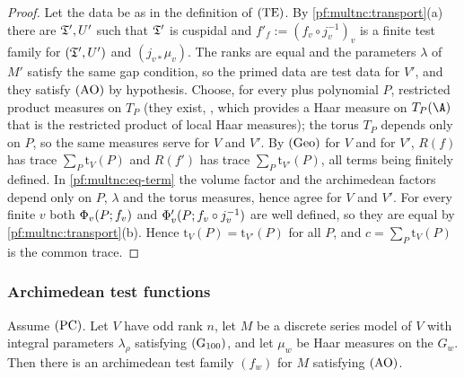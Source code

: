\begin{proof}
Let the data be as in the definition of $\textup{(TE)}$. By \cref{pf:multnc:transport}(a) there are $\mathfrak{T}',U'$ such
that $\mathfrak{T}'$ is cuspidal and $f'_f:=(f_v\circ j_v^{-1})_v$ is a finite test family for $(\mathfrak{T}',U')$ and
$(j_{v*}\mu_v)$. The ranks are equal and the parameters $\lambda$ of $M'$ satisfy the same gap condition, so the primed
data are test data for $V'$, and they satisfy $\textup{(AO)}$ by hypothesis. Choose, for every plus polynomial $P$,
restricted product measures on $T_P$ (they exist,
, which provides a Haar
measure on $T_P(\A)$ that is the restricted product of local Haar measures); the torus $T_P$ depends only on $P$, so the same
measures serve for $V$ and $V'$. By $\textup{(Geo)}$ for $V$ and for $V'$, $R(f)$ has trace $\sum_P\mathrm{t}_V(P)$ and
$R(f')$ has trace $\sum_P\mathrm{t}_{V'}(P)$, all terms being finitely defined. In \eqref{pf:multnc:eq-term} the volume
factor and the archimedean factors depend only on $P$, $\lambda$ and the torus measures, hence agree for $V$ and $V'$. For
every finite $v$ both $\Phi_v(P;f_v)$ and $\Phi'_v(P;f_v\circ j_v^{-1})$ are well defined, so they are equal by
\cref{pf:multnc:transport}(b). Hence $\mathrm{t}_V(P)=\mathrm{t}_{V'}(P)$ for all $P$, and $c=\sum_P\mathrm{t}_V(P)$ is the
common trace.
\end{proof}

\subsubsection*{Archimedean test functions}

\begin{lemma}\label{pf:multnc:testarch}
Assume $\textup{(PC)}$. Let $V$ have odd rank $n$, let $M$ be a discrete series model of $V$ with integral parameters
$\lambda_\rho$ satisfying $\textup{(G$_{100}$)}$, and let $\mu_w$ be Haar measures on the $G_w$. Then there is an
archimedean test family $(f_w)$ for $M$ satisfying $\textup{(AO)}$.
\end{lemma}

